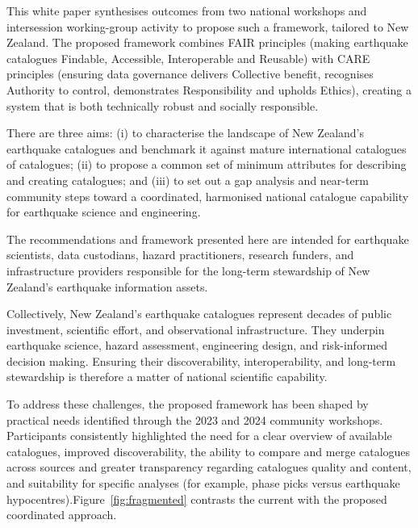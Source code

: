 \documentclass[11pt]{article}
\begin{document}
This white paper synthesises outcomes from two national workshops and intersession working-group activity to propose such a framework, tailored to New Zealand.  The proposed framework combines FAIR principles (making earthquake catalogues Findable, Accessible, Interoperable and Reusable) with CARE principles (ensuring data governance delivers Collective benefit, recognises Authority to control, demonstrates Responsibility and upholds Ethics), creating a system that is both technically robust and socially responsible. 

There are three aims: (i) to characterise the landscape of New Zealand's earthquake catalogues and benchmark it against mature international catalogues of catalogues; (ii) to propose a common set of minimum attributes for describing and creating catalogues; and (iii) to set out a gap analysis and near-term community steps toward a coordinated, harmonised national catalogue capability for earthquake science and engineering.

The recommendations and framework presented here are intended for earthquake scientists, data custodians, hazard practitioners, research funders, and infrastructure providers responsible for the long-term stewardship of New Zealand's earthquake information assets.

Collectively, New Zealand's earthquake catalogues represent decades of public investment, scientific effort, and observational infrastructure. They underpin earthquake science, hazard assessment, engineering design, and risk-informed decision making. Ensuring their discoverability, interoperability, and long-term stewardship is therefore a matter of national scientific capability.

To address these challenges, the proposed framework has been shaped by practical  needs identified through the 2023 and 2024 community workshops. Participants consistently highlighted the need for a clear overview of available catalogues, improved discoverability, the ability to compare and merge catalogues across sources and greater transparency regarding catalogues quality and content, and suitability for specific analyses (for example, phase picks versus earthquake hypocentres).Figure~\ref{fig:fragmented} contrasts the current with the proposed coordinated approach.
\end{document}
